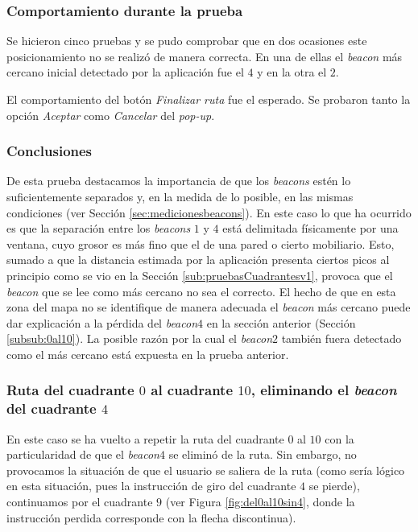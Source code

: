 \subsubsection*{Comportamiento durante la prueba}

Se hicieron cinco pruebas y se pudo comprobar que en dos ocasiones este posicionamiento no se realizó de manera correcta. En una de ellas el \textit{beacon} más cercano inicial detectado por la aplicación fue el $4$ y en la otra el $2$.

El comportamiento del botón \textit{Finalizar ruta} fue el esperado. Se probaron tanto la opción \textit{Aceptar} como \textit{Cancelar} del \textit{pop-up}.


\subsubsection*{Conclusiones}

De esta prueba destacamos la importancia de que los \textit{beacons} estén lo suficientemente separados y, en la medida de lo posible, en las mismas condiciones (ver Sección \ref{sec:medicionesbeacons}). En este caso lo que ha ocurrido es que la separación entre los \textit{beacons} $1$ y $4$ está delimitada físicamente por una ventana, cuyo grosor es más fino que el de una pared o cierto mobiliario. Esto, sumado a que la distancia estimada por la aplicación presenta ciertos picos al principio como se vio en la Sección \ref{sub:pruebasCuadrantesv1}, provoca que el \textit{beacon} que se lee como más cercano no sea el correcto. El hecho de que en esta zona del mapa no se identifique de manera adecuada el \textit{beacon} más cercano puede dar explicación a la pérdida del \textit{beacon$4$} en la sección anterior (Sección \ref{subsub:0al10}). La posible razón por la cual el \textit{beacon$2$} también fuera detectado como el más cercano está expuesta en la prueba anterior.


\subsubsection{Ruta del cuadrante $0$ al cuadrante $10$, eliminando el \textit{beacon} del cuadrante $4$}
\label{subsub:0al10sin4}

En este caso se ha vuelto a repetir la ruta del cuadrante $0$ al $10$ con la particularidad de que el \textit{beacon$4$} se eliminó de la ruta. Sin embargo, no provocamos la situación de que el usuario se saliera de la ruta (como sería lógico en esta situación, pues la instrucción de giro del cuadrante $4$ se pierde), continuamos por el cuadrante $9$ (ver Figura \ref{fig:del0al10sin4}, donde la instrucción perdida corresponde con la flecha discontinua). 

